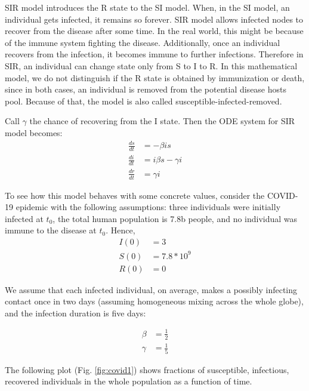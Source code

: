 SIR model introduces the R state to the SI model. When, in the SI model, an individual gets infected, it remains so forever. SIR model allows infected nodes to recover from the disease after some time. In the real world, this might be because of the immune system fighting the disease. Additionally, once an individual recovers from the infection, it becomes immune to further infections. Therefore in SIR, an individual can change state only from S to I to R. In this mathematical model, we do not distinguish if the R state is obtained by immunization or death, since in both cases, an individual is removed from the potential disease hosts pool. Because of that, the model is also called susceptible-infected-removed.

Call $\gamma$ the chance of recovering from the I state. Then the ODE system for SIR model becomes:
\begin{equation}
\begin{split}
\frac{ds}{dt} &= -\beta i s \\
\frac{di}{dt} &= i \beta s - \gamma i \\
\frac{dr}{dt} &= \gamma i
\end{split}
\end{equation}

To see how this model behaves with some concrete values, consider the COVID-19 epidemic with the following assumptions: three individuals were initially infected at $t_0$, the total human population is 7.8b people, and no individual was immune to the disease at $t_0$. Hence,
\begin{align*}
I(0) &= 3 \\
S(0) &= 7.8 * 10^9 \\
R(0) &= 0
\end{align*}

We assume that each infected individual, on average, makes a possibly infecting contact once in two days (assuming homogeneous mixing across the whole globe), and the infection duration is five days: 

\begin{align*}
\beta &= \frac{1}{2} \\
\gamma &= \frac{1}{5}
\end{align*}

The following plot (Fig. \ref{fig:covid1}) shows fractions of susceptible, infectious, recovered individuals in the whole population as a function of time.

